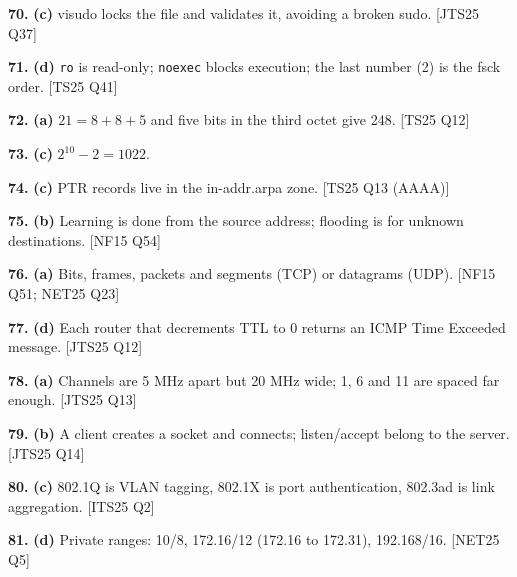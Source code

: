 \documentclass[11pt,a4paper]{article}
\begin{document}
\noindent\textbf{70.} \textbf{(c)} visudo locks the file and validates it, avoiding a broken sudo. {\color{ember}\scriptsize[JTS25 Q37]}\par\vspace{3pt}
\noindent\textbf{71.} \textbf{(d)} \texttt{ro} is read-only; \texttt{noexec} blocks execution; the last number (2) is the fsck order. {\color{ember}\scriptsize[TS25 Q41]}\par\vspace{3pt}
\noindent\textbf{72.} \textbf{(a)} $21=8+8+5$ and five bits in the third octet give 248. {\color{ember}\scriptsize[TS25 Q12]}\par\vspace{3pt}
\noindent\textbf{73.} \textbf{(c)} $2^{10}-2=1022$.\par\vspace{3pt}
\noindent\textbf{74.} \textbf{(c)} PTR records live in the in-addr.arpa zone. {\color{ember}\scriptsize[TS25 Q13 (AAAA)]}\par\vspace{3pt}
\noindent\textbf{75.} \textbf{(b)} Learning is done from the source address; flooding is for unknown destinations. {\color{ember}\scriptsize[NF15 Q54]}\par\vspace{3pt}
\noindent\textbf{76.} \textbf{(a)} Bits, frames, packets and segments (TCP) or datagrams (UDP). {\color{ember}\scriptsize[NF15 Q51; NET25 Q23]}\par\vspace{3pt}
\noindent\textbf{77.} \textbf{(d)} Each router that decrements TTL to 0 returns an ICMP Time Exceeded message. {\color{ember}\scriptsize[JTS25 Q12]}\par\vspace{3pt}
\noindent\textbf{78.} \textbf{(a)} Channels are 5 MHz apart but 20 MHz wide; 1, 6 and 11 are spaced far enough. {\color{ember}\scriptsize[JTS25 Q13]}\par\vspace{3pt}
\noindent\textbf{79.} \textbf{(b)} A client creates a socket and connects; listen/accept belong to the server. {\color{ember}\scriptsize[JTS25 Q14]}\par\vspace{3pt}
\noindent\textbf{80.} \textbf{(c)} 802.1Q is VLAN tagging, 802.1X is port authentication, 802.3ad is link aggregation. {\color{ember}\scriptsize[ITS25 Q2]}\par\vspace{3pt}
\noindent\textbf{81.} \textbf{(d)} Private ranges: 10/8, 172.16/12 (172.16 to 172.31), 192.168/16. {\color{ember}\scriptsize[NET25 Q5]}\par\vspace{3pt}
\end{document}
